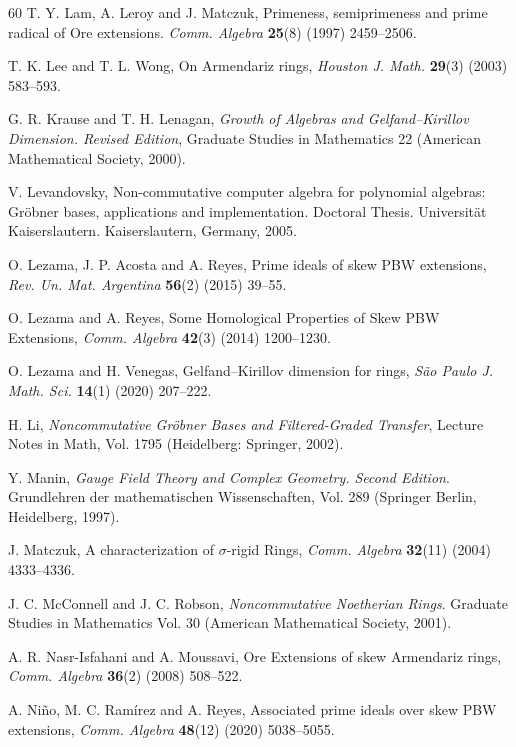 \documentclass{amsart}
\theoremstyle{definition}
\theoremstyle{remark}
\numberwithin{equation}{section}
\begin{document}
\begin{thebibliography}{60}
 T. Y. Lam, A. Leroy and J. Matczuk, Primeness, semiprimeness and prime radical of Ore extensions. {\em Comm. Algebra} {\bf 25}(8) (1997) 2459--2506.

T. K. Lee and T. L. Wong, On Armendariz rings, {\em Houston J. Math.} {\bf 29}(3) (2003) 583--593.

 G. R. Krause and T. H. Lenagan, {\em Growth of Algebras and Gelfand–Kirillov Dimension. Revised Edition}, Graduate Studies in Mathematics 22 (American Mathematical Society, 2000).

 V. Levandovsky, Non-commutative computer algebra for polynomial algebras: Gr\"obner bases, applications and implementation. Doctoral Thesis. Universit\"at Kaiserslautern. Kaiserslautern, Germany, 2005.

 O. Lezama, J. P. Acosta and A. Reyes, Prime ideals of skew PBW  extensions, {\em Rev. Un. Mat. Argentina} {\bf 56}(2) (2015) 39--55.

 O. Lezama and A. Reyes, Some Homological Properties of Skew PBW Extensions, {\em Comm. Algebra} {\bf 42}(3) (2014) 1200--1230.

 O. Lezama and H. Venegas, Gelfand–Kirillov dimension for rings, {\em S{\~a}o Paulo J. Math. Sci.} {\bf 14}(1) (2020) 207--222. 

 H. Li, {\em Noncommutative Gr\"obner Bases and Filtered-Graded Transfer}, Lecture Notes in Math, Vol. 1795 (Heidelberg: Springer, 2002).

 Y. Manin, {\em Gauge Field Theory and Complex Geometry. Second Edition}. Grundlehren der mathematischen Wissenschaften, Vol. 289 (Springer Berlin, Heidelberg, 1997).

 J. Matczuk, A characterization of $\sigma$-rigid Rings, {\em Comm. Algebra} {\bf 32}(11) (2004) 4333--4336.

 J. C. McConnell and J. C. Robson, {\em Noncommutative Noetherian Rings}. Graduate Studies in Mathematics Vol. 30 (American Mathematical Society, 2001).

 A. R. Nasr-Isfahani and A. Moussavi, Ore Extensions of skew Armendariz rings, {\em Comm. Algebra} {\bf 36}(2) (2008) 508--522.

 A. Ni\~no, M. C. Ram\'irez and A. Reyes, Associated prime ideals over skew PBW extensions, {\em Comm. Algebra} {\bf 48}(12) (2020) 5038--5055.


\end{thebibliography}
\end{document}
